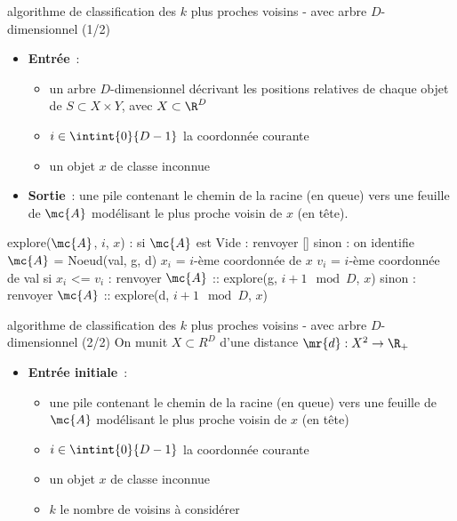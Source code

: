 \begin{adjustwidth}{-3cm}{-3cm}
\begin{implementation}{algorithme de classification des $k$ plus proches voisins - avec arbre $D$-dimensionnel (1/2)}
    \begin{itemize}
        \item \textbf{Entrée}~: \begin{itemize}
            \item un arbre $D$-dimensionnel décrivant les positions relatives de chaque objet de $S \subset X \times Y$, avec $X \subset \R^D$
            \item $i \in \intint{0}{D-1}$ la coordonnée courante
            \item un objet $x$ de classe inconnue
        \end{itemize}
        \item \textbf{Sortie}~: une pile contenant le chemin de la racine (en queue) vers une feuille de $\mc{A}$ modélisant le plus proche voisin de $x$ (en tête).
    \end{itemize}
    \begin{lstLNat}
    explore($\mc{A}$, $i$, $x$) :
        si $\mc{A}$ est Vide :
            renvoyer []
        sinon :
            on identifie $\mc{A}$ = Noeud(val, g, d)
            $x_i$ = $i$-ème coordonnée de $x$
            $v_i$ = $i$-ème coordonnée de val
            si $x_i$ <= $v_i$ :
                renvoyer $\mc{A}$ :: explore(g, $i+1 \mod D$, $x$)
            sinon : 
                renvoyer $\mc{A}$ :: explore(d, $i+1 \mod D$, $x$)
    \end{lstLNat}
\end{implementation}

\begin{implementation}{algorithme de classification des $k$ plus proches voisins - avec arbre $D$-dimensionnel (2/2)}
    On munit $X \subset R^D$ d'une distance $\mr{d} : X^2 \to \R_+$
    \begin{itemize}
        \item \textbf{Entrée initiale}~: \begin{itemize}
            \item une pile contenant le chemin de la racine (en queue) vers une feuille de $\mc{A}$ modélisant le plus proche voisin de $x$ (en tête)
            \item $i \in \intint{0}{D-1}$ la coordonnée courante
            \item un objet $x$ de classe inconnue
            \item $k$ le nombre de voisins à considérer
            

\end{itemize}
\end{itemize}
\end{implementation}
\end{adjustwidth}
